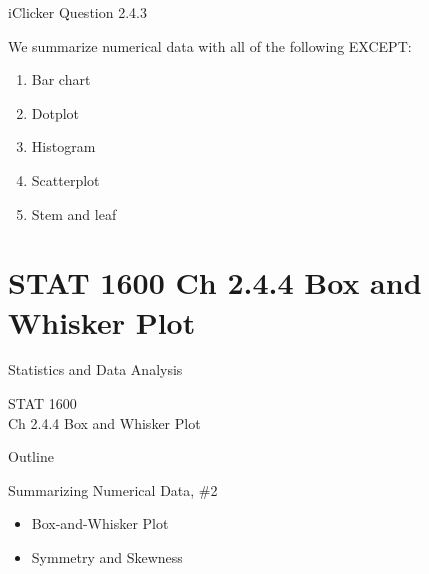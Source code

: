\documentclass[14pt]{beamer}\usepackage[]{graphicx}\usepackage[]{color}
\begin{document}
\begin{frame}[fragile]{iClicker Question 2.4.3}

We summarize numerical data with all of the following EXCEPT:

\begin{enumerate}
\item Bar chart
\item Dotplot
\item Histogram
\item Scatterplot
\item Stem and leaf
\end{enumerate}
\end{frame}



\section{STAT 1600 Ch 2.4.4 Box and Whisker Plot}

\begin{frame}[fragile]{Statistics and Data Analysis}

STAT 1600 \\
Ch 2.4.4 Box and Whisker Plot

\end{frame}

\begin{frame}[fragile]{Outline}

Summarizing Numerical Data, \#2  

\begin{itemize}
\item Box-and-Whisker Plot  
\item Symmetry and Skewness
\end{itemize}
\end{frame}
\end{document}
